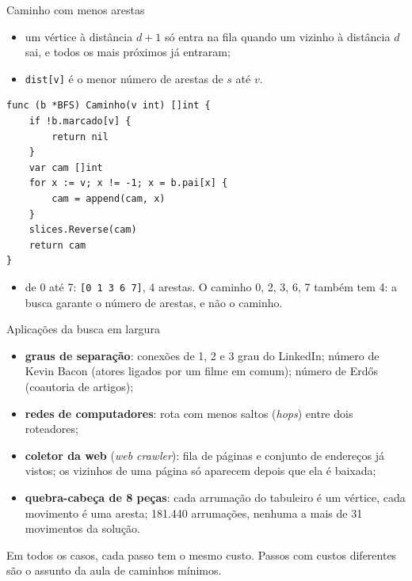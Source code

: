 \documentclass{beamer}
\begin{document}
\begin{frame}[fragile]{Caminho com menos arestas}
	\begin{itemize}
		\item um vértice à distância $d+1$ só entra na fila quando um vizinho à
		      distância $d$ sai, e todos os mais próximos já entraram;
		\item \texttt{dist[v]} é o menor número de arestas de $s$ até $v$.
	\end{itemize}

	\begin{verbatim}
func (b *BFS) Caminho(v int) []int {
	if !b.marcado[v] {
		return nil
	}
	var cam []int
	for x := v; x != -1; x = b.pai[x] {
		cam = append(cam, x)
	}
	slices.Reverse(cam)
	return cam
}
\end{verbatim}

	\begin{itemize}
		\item de 0 até 7: \texttt{[0 1 3 6 7]}, 4 arestas. O caminho 0, 2, 3, 6, 7
		      também tem 4: a busca garante o número de arestas, e não o caminho.
	\end{itemize}
\end{frame}

\begin{frame}{Aplicações da busca em largura}
	\begin{itemize}
		\item \textbf{graus de separação}: conexões de 1\textordmasculine, 2\textordmasculine{} e 3\textordmasculine{} grau do
		      LinkedIn; número de Kevin Bacon (atores ligados por um filme em
		      comum); número de Erd\H{o}s (coautoria de artigos);
		\item \textbf{redes de computadores}: rota com menos saltos
		      (\textit{hops}) entre dois roteadores;
		\item \textbf{coletor da web} (\textit{web crawler}): fila de páginas e
		      conjunto de endereços já vistos; os vizinhos de uma página só
		      aparecem depois que ela é baixada;
		\item \textbf{quebra-cabeça de 8 peças}: cada arrumação do tabuleiro é
		      um vértice, cada movimento é uma aresta; 181.440 arrumações,
		      nenhuma a mais de 31 movimentos da solução.
	\end{itemize}

	\vspace{0.2cm}
	Em todos os casos, cada passo tem o mesmo custo. Passos com custos
	diferentes são o assunto da aula de caminhos mínimos.
\end{frame}
\end{document}
